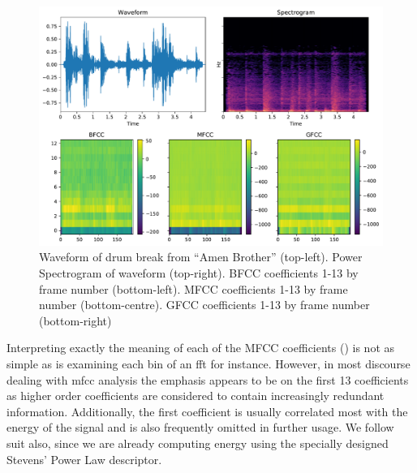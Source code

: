 {{\begin{figure}
	\begin{center}
		\includegraphics[scale=0.75]{ch05_pyconcat/figures/wave_spec_mfcc_bfcc.pdf}		
		\end{center}
		\caption[Waveform, Spectrogram, BFCC, MFCC and GFCC impressions of the ``Amen Break'' drum solo from ``Amen Brother'']{Waveform of drum break from ``Amen Brother'' (top-left). Power Spectrogram of waveform (top-right). BFCC coefficients 1-13 by frame number (bottom-left). MFCC coefficients 1-13 by frame number (bottom-centre). GFCC coefficients 1-13 by frame number (bottom-right)}
	\label{fig:bfcc_mfcc_gfcc_compared}
\end{figure}



Interpreting exactly the meaning of each of the MFCC coefficients () is not as simple as is examining each bin of an \acrshort{fft} for instance. However, in most discourse dealing with \acrshort{mfcc} analysis the emphasis appears to be on the first 13 coefficients as higher order coefficients are considered to contain increasingly redundant information. Additionally, the first coefficient is usually correlated most with the energy of the signal and is also frequently omitted in further usage.  We follow suit also, since we are already computing energy using the specially designed Stevens' Power Law descriptor.

}}
